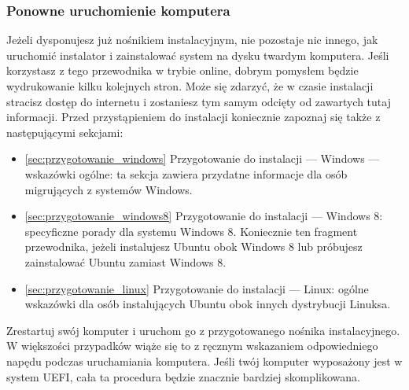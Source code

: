 \subsubsection{Ponowne uruchomienie komputera}
Jeżeli dysponujesz już  nośnikiem instalacyjnym, nie pozostaje nic innego, jak uruchomić instalator i zainstalować system na dysku twardym komputera. Jeśli korzystasz z tego przewodnika w trybie online, dobrym pomysłem będzie wydrukowanie kilku kolejnych stron. Może się zdarzyć, że w czasie instalacji stracisz dostęp do internetu i zostaniesz tym samym odcięty od zawartych tutaj informacji.
Przed przystąpieniem do instalacji koniecznie zapoznaj się także z następującymi sekcjami:
\begin{itemize}
\item \ref{sec:przygotowanie_windows} \textcolor{ubuntu_orange}{Przygotowanie do instalacji --- Windows --- wskazówki ogólne}: ta sekcja zawiera przydatne informacje dla osób migrujących z systemów Windows.
\item \ref{sec:przygotowanie_windows8} \textcolor{ubuntu_orange}{Przygotowanie do instalacji --- Windows 8}: specyficzne porady dla systemu Windows 8. Koniecznie ten fragment przewodnika, jeżeli instalujesz Ubuntu obok Windows 8 lub próbujesz zainstalować Ubuntu zamiast Windows 8.
\item \ref{sec:przygotowanie_linux} \textcolor{ubuntu_orange}{Przygotowanie do instalacji --- Linux}: ogólne wskazówki dla osób instalujących Ubuntu obok innych dystrybucji Linuksa.
\end{itemize}

Zrestartuj swój komputer i uruchom go z przygotowanego nośnika instalacyjnego. W większości przypadków wiąże się to z ręcznym wskazaniem odpowiedniego napędu podczas uruchamiania komputera. Jeśli twój komputer wyposażony jest w system UEFI, cała ta procedura będzie znacznie bardziej skomplikowana.
